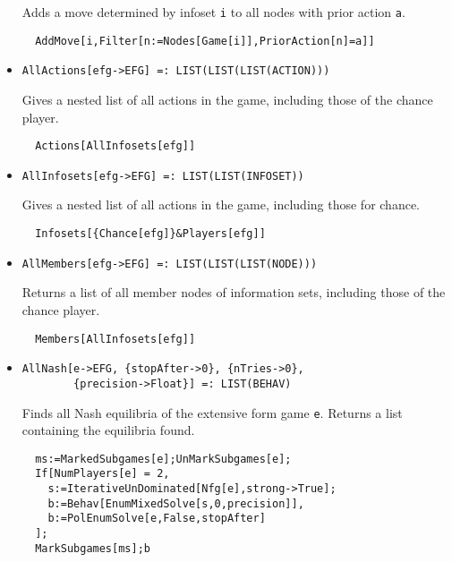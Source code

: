 \begin{itemize}
\bd 
Adds a move determined by infoset \verb+i+ to all nodes with prior
action \verb+a+.  
\begin{verbatim}
  AddMove[i,Filter[n:=Nodes[Game[i]],PriorAction[n]=a]]
\end{verbatim} 
\ed

\item{}
\protect \large \begin{verbatim}
AllActions[efg->EFG] =: LIST(LIST(LIST(ACTION))) 
\end{verbatim}\normalsize

\bd 
Gives a nested list of all actions in the game, including those of
the chance player.  
\begin{verbatim}
  Actions[AllInfosets[efg]]
\end{verbatim} 
\ed

\item{}
\protect \large \begin{verbatim}
AllInfosets[efg->EFG] =: LIST(LIST(INFOSET)) 
\end{verbatim}\normalsize

\bd 
Gives a nested list of all actions in the game, including those for
chance. 
\begin{verbatim}
  Infosets[{Chance[efg]}&Players[efg]]
\end{verbatim} 
\ed

\item{}
\protect \large \begin{verbatim}
AllMembers[efg->EFG] =: LIST(LIST(LIST(NODE))) 
\end{verbatim}\normalsize

\bd 
Returns a list of all member nodes of information sets, including
those of the chance player.
\begin{verbatim}
  Members[AllInfosets[efg]]
\end{verbatim} 
\ed

\item{}
\protect \large \begin{verbatim}
AllNash[e->EFG, {stopAfter->0}, {nTries->0}, 
        {precision->Float}] =: LIST(BEHAV) 
\end{verbatim}\normalsize

\bd 
Finds all Nash equilibria of the extensive form game
\verb+e+.  Returns a list containing the equilibria found.

\begin{verbatim}
  ms:=MarkedSubgames[e];UnMarkSubgames[e];
  If[NumPlayers[e] = 2, 
    s:=IterativeUnDominated[Nfg[e],strong->True];
    b:=Behav[EnumMixedSolve[s,0,precision]],
    b:=PolEnumSolve[e,False,stopAfter]
  ];
  MarkSubgames[ms];b
\end{verbatim} 
\ed


\end{itemize}
